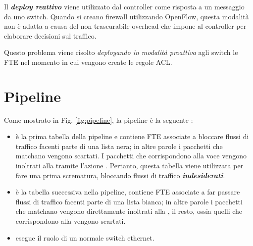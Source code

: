 Il \textbf{\textit{deploy reattivo}} viene utilizzato dal controller come risposta a un messaggio  da uno switch. Quando si creano firewall utilizzando OpenFlow, questa modalità non è adatta a causa del non trascurabile overhead che impone al controller per elaborare decisioni sul traffico.

Questo problema viene risolto \textit{deployando in modalità proattiva} agli switch le FTE nel momento in cui vengono create le regole ACL.

\section{Pipeline}\label{pipeline}

Come mostrato in Fig. \ref{fig:pipeline}, la pipeline è la seguente \cite{bakker2016network}:
\begin{itemize}
  \item {} è la prima tabella della pipeline e contiene FTE associate a bloccare flussi di traffico facenti parte di una lista nera; in altre parole i pacchetti che matchano vengono scartati. I pacchetti che corrispondono alla voce  vengono inoltrati alla  tramite l'azione . Pertanto, questa tabella viene utilizzata per fare una prima scrematura, bloccando flussi di traffico \textbf{\textit{indesiderati}}.

  \item {} è la tabella successiva nella pipeline, contiene FTE associate a far passare flussi di traffico facenti parte di una lista bianca; in altre parole i pacchetti che matchano vengono direttamente inoltrati alla , il resto, ossia quelli che corrispondono alla  vengono scartati.

  \item {} esegue il ruolo di un normale switch ethernet.
\end{itemize}
